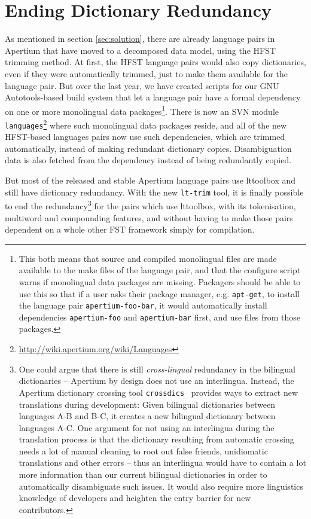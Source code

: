 \documentclass[10pt, a4paper]{article}
\newcommand{\tool}[1]{\texttt{#1}}
\begin{document}

\section{Ending Dictionary Redundancy}

As mentioned in section \ref{sec:solution}, there are already language
pairs in Apertium that have moved to a decomposed data model, using
the HFST trimming method. At first, the HFST language
pairs would also copy dictionaries, even if they were automatically
trimmed, just to make them available for the language pair.  But over
the last year, we have created scripts for our GNU Autotools-based
build system that let a language pair have a formal dependency on one
or more monolingual data packages\footnote{This both means that source
    and compiled monolingual files are made available to the make
    files of the language pair, and that the configure script warns if
    monolingual data packages are missing. Packagers should be able to
    use this so 
    that if a user asks their package manager, e.g. \tool{apt-get}, to
    install the language pair \tool{apertium-foo-bar}, it would
automatically install dependencies \tool{apertium-foo} and
\tool{apertium-bar} first, and use files from those packages.}.  There
is now an SVN module
\texttt{languages}\footnote{\href{http://wiki.apertium.org/wiki/Languages}{http://wiki.apertium.org/wiki/Languages}}
where such monolingual data packages reside, and all of the new
HFST-based languages pairs now use such dependencies, which are
trimmed automatically, instead of making redundant dictionary copies.
Disambiguation data is also fetched from the dependency instead of
being redundantly copied.

But most of the released and stable Apertium language pairs use
lttoolbox and still have dictionary redundancy. With the new
\tool{lt-trim} tool, it is finally possible to end the
redundancy\footnote{One could argue that there is still
  \emph{cross-lingual} redundancy in the bilingual dictionaries --
  Apertium by design does not use an interlingua. Instead, the
  Apertium dictionary crossing tool
  \tool{crossdics}~\cite{toral2011crossdics-it-ca} provides ways to
  extract new translations during development: Given bilingual
  dictionaries between languages A-B and B-C, it creates a new
  bilingual dictionary between languages A-C. One argument for not
  using an interlingua during the translation process is that the
  dictionary resulting from automatic crossing needs a lot of manual
  cleaning to root out false friends, unidiomatic translations and
  other errors -- thus an interlingua would have to contain a lot more
  information than our current bilingual dictionaries in order to
  automatically disambiguate such issues. It would also require more
  linguistics knowledge of developers and heighten the entry barrier
  for new contributors.} for the pairs which use lttoolbox, with its
tokenisation, multiword and compounding features, and without having
to make those pairs dependent on a whole other FST framework simply
for compilation.
\end{document}
